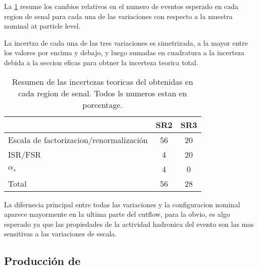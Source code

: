 %

La \cref{tab:syst_ttbargam_truth} resume los cambios relativos en el
numero de eventos esperado en cada region de senal para cada una de las
variaciones con respecto a la muestra nominal at particle level.

La incertza de cada una de las tres variaciones es simetrizada, a la mayor
entre los valores por encima y debajo, y luego sumadas en cuadratura
a la incerteza debida a la seccion eficas para obtner la incerteza teorica
total. %

\begin{table}[ht!]
  \centering
  \caption{Resumen de las incertezas teoricas del {\ttgam} obtenidas en cada region de senal.
    Todos ls numeros estan en porcentage.}
  \begin{tabular}{ l | c  c  }
   \hline
    & SR2 & SR3 \\
   \hline
   Escala de factorizacion/renormalizaci\'on &  56  & 20 \\
      ISR/FSR                              &  4   & 20 \\
      $\alpha_{s}$                         &  4   &  0 \\
      \hline
      \hline
      Total				&   56    &   28 \\
      \hline
  \end{tabular}
  \label{tab:syst_ttbargam_truth}
\end{table}

La difernecia principal entre todas las variaciones y la configuracion
nominal aparece mayormente en la ultima parte del cutflow, para la
obvio, es algo esperado ya que las propiedades de la actividad hadronica
del evento son las mas sensitivas a las variaciones de escala.

\subsection{Producción de {\wgam}}\label{sec:syst_wgamma}

